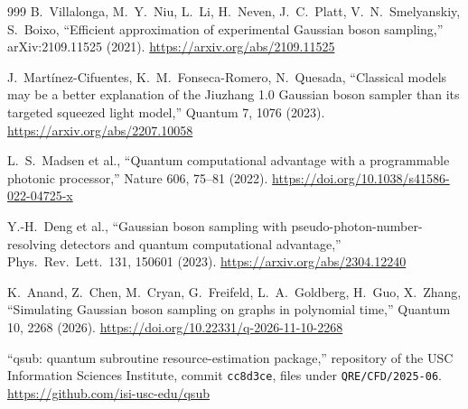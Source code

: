 \begin{thebibliography}{999}
 B.~Villalonga, M.~Y.~Niu, L.~Li, H.~Neven, J.~C.~Platt, V.~N.~Smelyanskiy, S.~Boixo, ``Efficient approximation of experimental Gaussian boson sampling,'' arXiv:2109.11525 (2021). \url{https://arxiv.org/abs/2109.11525}

 J.~Mart\'inez-Cifuentes, K.~M.~Fonseca-Romero, N.~Quesada, ``Classical models may be a better explanation of the Jiuzhang 1.0 Gaussian boson sampler than its targeted squeezed light model,'' Quantum 7, 1076 (2023). \url{https://arxiv.org/abs/2207.10058}

 L.~S.~Madsen et al., ``Quantum computational advantage with a programmable photonic processor,'' Nature 606, 75--81 (2022). \url{https://doi.org/10.1038/s41586-022-04725-x}

 Y.-H.~Deng et al., ``Gaussian boson sampling with pseudo-photon-number-resolving detectors and quantum computational advantage,'' Phys.\ Rev.\ Lett.\ 131, 150601 (2023). \url{https://arxiv.org/abs/2304.12240}

 K.~Anand, Z.~Chen, M.~Cryan, G.~Freifeld, L.~A.~Goldberg, H.~Guo, X.~Zhang, ``Simulating Gaussian boson sampling on graphs in polynomial time,'' Quantum 10, 2268 (2026). \url{https://doi.org/10.22331/q-2026-11-10-2268}

 ``qsub: quantum subroutine resource-estimation package,'' repository of the USC Information Sciences Institute, commit \texttt{cc8d3ce}, files under \texttt{QRE/CFD/2025-06}. \url{https://github.com/isi-usc-edu/qsub}


\end{thebibliography}
